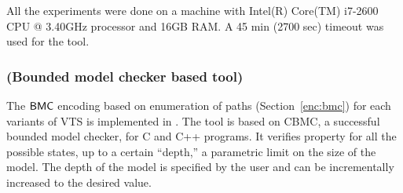 All the experiments were done
on a machine with Intel(R) Core(TM) i7-2600 CPU @ 3.40GHz processor and 16GB RAM.
%
A 45 min (2700 sec) timeout was used for the tool.

%

%

\subsubsection{{\sattool} (Bounded model checker based tool)}
The $\mathsf{BMC}$ encoding based on enumeration of paths (Section~\ref{enc:bmc}) for each variants of VTS is implemented in {\sattool}.
The tool is based on CBMC, a successful bounded model checker, for C and C++ programs. 
%
%
It verifies property for all the possible states, up to a certain “depth,” a parametric limit on the size of the model.
%
The depth of the model is specified by the user and can be incrementally increased to the desired value.
%
%

